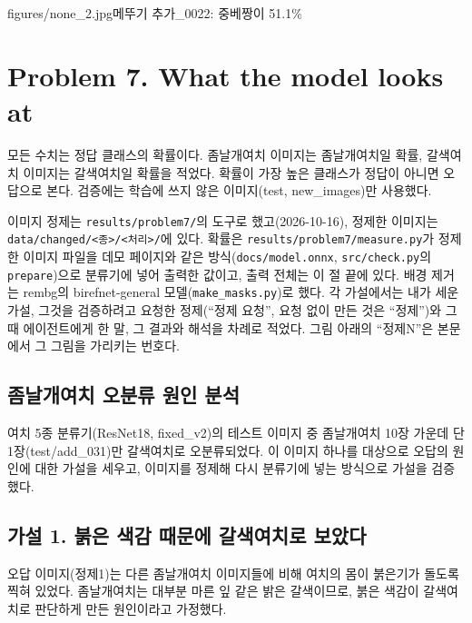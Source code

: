 \documentclass[11pt]{article}
\begin{document}
           {figures/none_2.jpg}{메뚜기 추가\_0022: 중베짱이 51.1\%}


\section*{Problem 7. What the model looks at}

모든 수치는 정답 클래스의 확률이다. 좀날개여치 이미지는 좀날개여치일 확률, 갈색여치 이미지는 갈색여치일 확률을 적었다. 확률이 가장 높은 클래스가 정답이 아니면 오답으로 본다. 검증에는 학습에 쓰지 않은 이미지(test, new\_images)만 사용했다.

이미지 정제는 \texttt{results/problem7/}의 도구로 했고(2026-10-16), 정제한 이미지는 \texttt{data/changed/<종>/<처리>/}에 있다. 확률은 \texttt{results/problem7/measure.py}가 정제한 이미지 파일을 데모 페이지와 같은 방식(\texttt{docs/model.onnx}, \texttt{src/check.py}의 \texttt{prepare})으로 분류기에 넣어 출력한 값이고, 출력 전체는 이 절 끝에 있다. 배경 제거는 rembg의 birefnet-general 모델(\texttt{make\_masks.py})로 했다. 각 가설에서는 내가 세운 가설, 그것을 검증하려고 요청한 정제(``정제 요청'', 요청 없이 만든 것은 ``정제'')와 그때 에이전트에게 한 말, 그 결과와 해석을 차례로 적었다. 그림 아래의 ``정제N''은 본문에서 그 그림을 가리키는 번호다.

\subsection*{좀날개여치 오분류 원인 분석}

여치 5종 분류기(ResNet18, fixed\_v2)의 테스트 이미지 중 좀날개여치 10장 가운데 단 1장(test/add\_031)만 갈색여치로 오분류되었다. 이 이미지 하나를 대상으로 오답의 원인에 대한 가설을 세우고, 이미지를 정제해 다시 분류기에 넣는 방식으로 가설을 검증했다.

\subsection*{가설 1. 붉은 색감 때문에 갈색여치로 보았다}

오답 이미지(정제1)는 다른 좀날개여치 이미지들에 비해 여치의 몸이 붉은기가 돌도록 찍혀 있었다. 좀날개여치는 대부분 마른 잎 같은 밝은 갈색이므로, 붉은 색감이 갈색여치로 판단하게 만든 원인이라고 가정했다.
\end{document}
